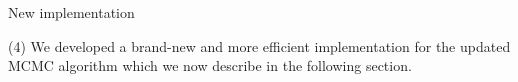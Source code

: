 \documentclass[
	11pt, %
 xcolor={dvipsnames,svgnames}
]{beamer}
\newcommand{\balert}[1]{\textbf{\alert{#1}}}
\begin{document}
\begin{frame}{New implementation}

\alert{(4) We developed a brand-new and more efficient implementation for the updated MCMC algorithm} which we now describe in the following section.
\end{frame}






\end{document}
